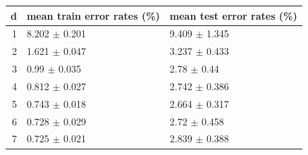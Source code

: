 \begin{tabular}{rll}
\toprule
d & mean train error rates (\%) & mean test error rates (\%) \\
\midrule
1 & 8.202 $\pm$ 0.201 & 9.409 $\pm$ 1.345 \\
2 & 1.621 $\pm$ 0.047 & 3.237 $\pm$ 0.433 \\
3 & 0.99 $\pm$ 0.035 & 2.78 $\pm$ 0.44 \\
4 & 0.812 $\pm$ 0.027 & 2.742 $\pm$ 0.386 \\
5 & 0.743 $\pm$ 0.018 & 2.664 $\pm$ 0.317 \\
6 & 0.728 $\pm$ 0.029 & 2.72 $\pm$ 0.458 \\
7 & 0.725 $\pm$ 0.021 & 2.839 $\pm$ 0.388 \\
\bottomrule
\end{tabular}
